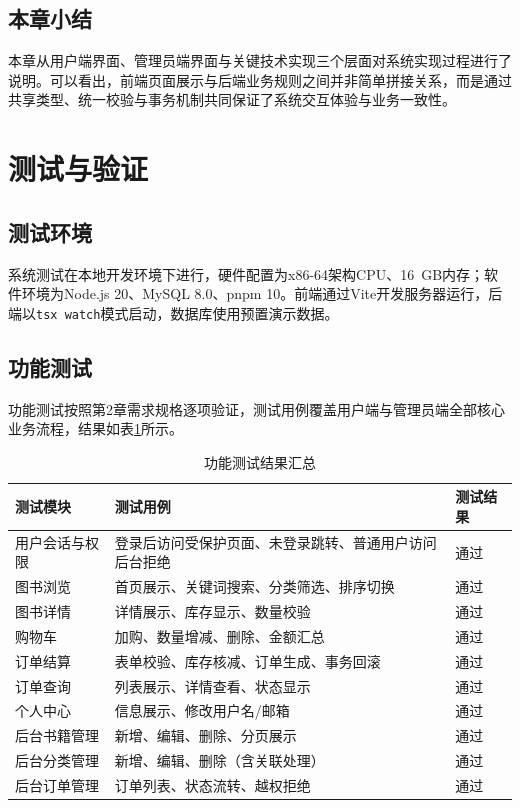 \documentclass[12pt,a4paper]{ctexart}
\begin{document}
\subsection{本章小结}

本章从用户端界面、管理员端界面与关键技术实现三个层面对系统实现过程进行了说明。可以看出，前端页面展示与后端业务规则之间并非简单拼接关系，而是通过共享类型、统一校验与事务机制共同保证了系统交互体验与业务一致性。


\section{测试与验证}

\subsection{测试环境}

系统测试在本地开发环境下进行，硬件配置为x86-64架构CPU、16\ GB内存；软件环境为Node.js 20、MySQL 8.0、pnpm 10。前端通过Vite开发服务器运行，后端以\texttt{tsx watch}模式启动，数据库使用预置演示数据。

\subsection{功能测试}

功能测试按照第2章需求规格逐项验证，测试用例覆盖用户端与管理员端全部核心业务流程，结果如表\ref{tab:func-test}所示。

\begin{table}[H]
  \centering
  \caption{功能测试结果汇总}
  \label{tab:func-test}
  \small
  \begin{tabularx}{\textwidth}{p{3.1cm} p{7.0cm} p{1.8cm}}
    \toprule
    测试模块 & 测试用例 & 测试结果 \\
    \midrule
    用户会话与权限 & 登录后访问受保护页面、未登录跳转、普通用户访问后台拒绝 & 通过 \\
    图书浏览 & 首页展示、关键词搜索、分类筛选、排序切换 & 通过 \\
    图书详情 & 详情展示、库存显示、数量校验 & 通过 \\
    购物车 & 加购、数量增减、删除、金额汇总 & 通过 \\
    订单结算 & 表单校验、库存核减、订单生成、事务回滚 & 通过 \\
    订单查询 & 列表展示、详情查看、状态显示 & 通过 \\
    个人中心 & 信息展示、修改用户名/邮箱 & 通过 \\
    后台书籍管理 & 新增、编辑、删除、分页展示 & 通过 \\
    后台分类管理 & 新增、编辑、删除（含关联处理）& 通过 \\
    后台订单管理 & 订单列表、状态流转、越权拒绝 & 通过 \\
    \bottomrule
  \end{tabularx}
\end{table}
\end{document}
